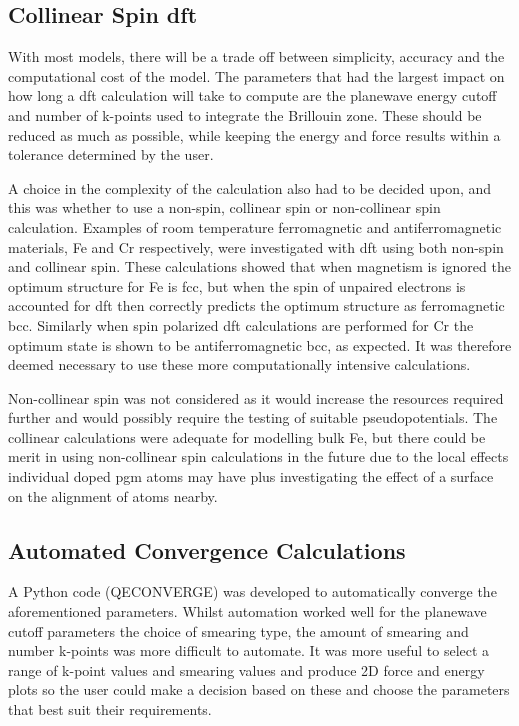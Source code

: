 \subsection{Collinear Spin \acrshort{dft}}

With most models, there will be a trade off between simplicity, accuracy and the computational cost of the model.  The parameters that had the largest impact on how long a \acrshort{dft} calculation will take to compute are the planewave energy cutoff and number of k-points used to integrate the Brillouin zone.  These should be reduced as much as possible, while keeping the energy and force results within a tolerance determined by the user.

A choice in the complexity of the calculation also had to be decided upon, and this was whether to use a non-spin, collinear spin or non-collinear spin calculation.  Examples of room temperature ferromagnetic and antiferromagnetic materials, Fe and Cr respectively, were investigated with \acrshort{dft} using both non-spin and collinear spin.  These calculations showed that when magnetism is ignored the optimum structure for Fe is \acrshort{fcc}, but when the spin of unpaired electrons is accounted for \acrshort{dft} then correctly predicts the optimum structure as ferromagnetic \acrshort{bcc}.  Similarly when spin polarized \acrshort{dft} calculations are performed for Cr the optimum state is shown to be antiferromagnetic \acrshort{bcc}, as expected.  It was therefore deemed necessary to use these more computationally intensive calculations.

Non-collinear spin was not considered as it would increase the resources required further and would possibly require the testing of suitable pseudopotentials.  The collinear calculations were adequate for modelling bulk \Gls{Fe}, but there could be merit in using non-collinear spin calculations in the future due to the local effects individual doped \acrshort{pgm} atoms may have plus investigating the effect of a surface on the alignment of atoms nearby.


\subsection{Automated Convergence Calculations}

A Python code (QECONVERGE) was developed to automatically converge the aforementioned parameters.  Whilst automation worked well for the planewave cutoff parameters the choice of smearing type, the amount of smearing and number k-points was more difficult to automate.  It was more useful to select a range of k-point values and smearing values and produce 2D force and energy plots so the user could make a decision based on these and choose the parameters that best suit their requirements.

